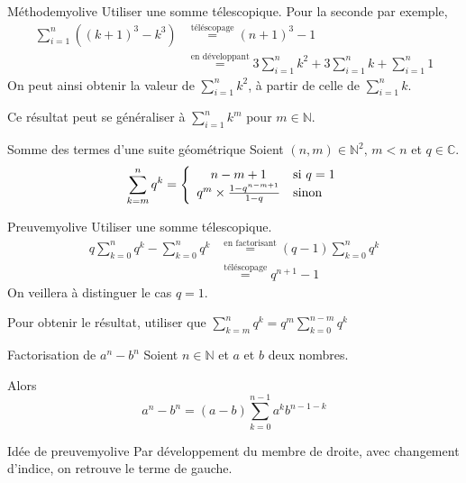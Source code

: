     \begin{demo}{Méthode}{myolive}
        Utiliser une somme télescopique.
        Pour la seconde par exemple, 
        \begin{align*}
            \sum\limits_{i=1}^n \left((k+1)^3 -k^3\right) & \overset{\text{téléscopage}}{=} (n+1)^3 -1 \\
            & \overset{\text{en développant}}{=} 3 \sum\limits_{i=1}^n k^2 + 3 \sum\limits_{i=1}^n k + \sum\limits_{i=1}^n 1
        \end{align*}
        On peut ainsi obtenir la valeur de $\sum\limits_{i=1}^n k^2$, à partir de celle de $\sum\limits_{i=1}^n k$. 
        
        Ce résultat peut se généraliser à $\sum\limits_{i=1}^n k^m$ pour $m \in \mathbb{N}$.
    \end{demo}

    \begin{prop}{Somme des termes d’une suite géométrique}{}
        Soient $(n,m) \in \mathbb{N}^2, \, m < n$ et $q \in \mathbb{C}$.
        \[ \sum\limits_{k = m}^{n} q^k = \sisinon{n-m+1}{q = 1}{q^m \times \frac{1-q^{n-m+1}}{1-q}} \]
    \end{prop}

    \begin{demo}{Preuve}{myolive}
        Utiliser une somme télescopique.
        \begin{align*}
            q \sum\limits_{k=0}^n q^k - \sum\limits_{k=0}^n q^k & \overset{\text{en factorisant}}{=} (q-1) \sum\limits_{k=0}^n q^k \\
            & \overset{\text{téléscopage}}{=} q^{n+1} - 1
        \end{align*}
        On veillera à distinguer le cas $q = 1$.
    
        Pour obtenir le résultat, utiliser que $\sum\limits_{k=m}^n q^k = q^m \sum\limits_{k=0}^{n-m} q^k  $
    \end{demo}

    \begin{prop}{Factorisation de $a^{n}-b^{n}$}{}
        Soient $n \in \mathbb{N}$ et $a$ et $b$ deux nombres.
    
        Alors 
        \[ a^{n}-b^{n} = (a-b) \sum\limits_{k = 0}^{n-1} a^{k}b^{n-1-k} \]
    \end{prop}
    
    \begin{demo}{Idée de preuve}{myolive}
        Par développement du membre de droite, avec changement d’indice, on retrouve le terme de gauche.
    \end{demo}

